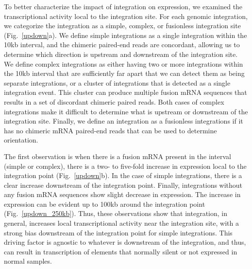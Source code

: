 \documentclass[10pt]{article}
\begin{document}
To better characterize the impact of integration on expression, we examined the transcriptional activity local to the integration site.  For each genomic integration, we categorize the integration as a simple, complex, or fusionless integration site (Fig.~\ref{updown}a).  We define simple integrations as a single integration within the 10kb interval, and the chimeric paired-end reads are concordant, allowing us to determine which direction is upstream and downstream of the integration site.  We define complex integrations as either having two or more integrations within the 10kb interval that are sufficiently far apart that we can detect them as being separate integrations, or a cluster of integrations that is detected as a single integration event.  This cluster can produce multiple fusion mRNA sequences that results in a set of discordant chimeric paired reads.  Both cases of complex integrations make it difficult to determine what is upstream or downstream of the integration site.  Finally, we define an integration as a fusionless integrations if it has no chimeric mRNA paired-end reads that can be used to determine orientation.

The first observation is when there is a fusion mRNA present in the interval (simple or complex), there is a two- to five-fold increase in expression local to the integration point (Fig.~\ref{updown}b).  In the case of simple integrations, there is a clear increase downstream of the integration point.  Finally, integrations without any fusion mRNA sequences show slight decrease in expression.  The increase in expression can be evident up to 100kb around the integration point (Fig.~\ref{updown_250kb}).  Thus, these observations show that integration, in general, increases local transcriptional activity near the integration site, with a strong bias downstream of the integration point for simple integrations.  This driving factor is agnostic to whatever is downstream of the integration, and thus, can result in transcription of elements that normally silent or not expressed in normal samples. 
\end{document}
